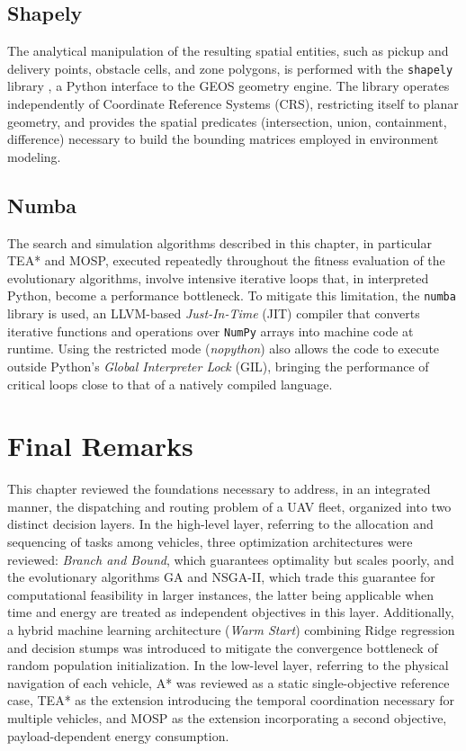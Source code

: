 \subsection{Shapely}

The analytical manipulation of the resulting spatial entities, such as pickup and delivery points, obstacle cells, and zone polygons, is performed with the \texttt{shapely} library \cite{Gillies2007}, a Python interface to the GEOS geometry engine. The library operates independently of Coordinate Reference Systems (CRS), restricting itself to planar geometry, and provides the spatial predicates (intersection, union, containment, difference) necessary to build the bounding matrices employed in environment modeling.

\subsection{Numba}

The search and simulation algorithms described in this chapter, in particular TEA* and MOSP, executed repeatedly throughout the fitness evaluation of the evolutionary algorithms, involve intensive iterative loops that, in interpreted Python, become a performance bottleneck. To mitigate this limitation, the \texttt{numba} library \cite{Lam2015} is used, an LLVM-based \textit{Just-In-Time} (JIT) compiler that converts iterative functions and operations over \texttt{NumPy} arrays into machine code at runtime. Using the restricted mode (\textit{nopython}) also allows the code to execute outside Python's \textit{Global Interpreter Lock} (GIL), bringing the performance of critical loops close to that of a natively compiled language.

\section{Final Remarks}\label{sec:consideracoes}

This chapter reviewed the foundations necessary to address, in an integrated manner, the dispatching and routing problem of a UAV fleet, organized into two distinct decision layers. In the high-level layer, referring to the allocation and sequencing of tasks among vehicles, three optimization architectures were reviewed: \textit{Branch and Bound}, which guarantees optimality but scales poorly, and the evolutionary algorithms GA and NSGA-II, which trade this guarantee for computational feasibility in larger instances, the latter being applicable when time and energy are treated as independent objectives in this layer. Additionally, a hybrid machine learning architecture (\textit{Warm Start}) combining Ridge regression and decision stumps was introduced to mitigate the convergence bottleneck of random population initialization. In the low-level layer, referring to the physical navigation of each vehicle, A* was reviewed as a static single-objective reference case, TEA* as the extension introducing the temporal coordination necessary for multiple vehicles, and MOSP as the extension incorporating a second objective, payload-dependent energy consumption.

